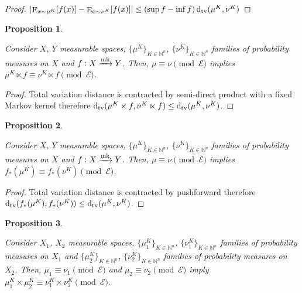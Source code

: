 \documentclass{article}
\numberwithin{equation}{section}
\theoremstyle{definition}
\theoremstyle{plain}
\newtheorem{proposition}{Proposition}[section]
\DeclareMathOperator{\E}{E}
\newcommand{\Dtv}{\operatorname{d}_{\textnormal{tv}}}
\newcommand{\Nats}{\mathbb{N}}
\newcommand{\Abs}[1]{\lvert #1 \rvert}
\newcommand{\Fall}{\mathcal{E}}
\newcommand{\Markov}{\xrightarrow{\textnormal{mk}}}
\begin{document}
\begin{proof}

$\Abs{\E_{x \sim \mu^K}[f(x)] - \E_{x \sim \nu^K}[f(x)]} \leq  (\sup f - \inf f)\Dtv(\mu^K, \nu^K)$
\end{proof}

\begin{samepage}
\begin{proposition}
\label{prp:prob_cong_semidir}

Consider $X$, $Y$ measurable spaces, $\{\mu^K\}_{K \in \Nats^n}$, $\{\nu^K\}_{K \in \Nats^n}$ families of probability measures on $X$ and $f: X \Markov Y$. Then, $\mu \equiv \nu \pmod \Fall$ implies $\mu^K \ltimes f \equiv \nu^K \ltimes f \pmod \Fall$.

\end{proposition}
\end{samepage}

\begin{proof}

Total variation distance is contracted by semi-direct product with a fixed Markov kernel therefore $\Dtv(\mu^K \ltimes f, \nu^K \ltimes f) \leq \Dtv(\mu^K, \nu^K)$.
\end{proof}

\begin{samepage}
\begin{proposition}
\label{prp:prob_cong_push}

Consider $X$, $Y$ measurable spaces, $\{\mu^K\}_{K \in \Nats^n}$, $\{\nu^K\}_{K \in \Nats^n}$ families of probability measures on $X$ and $f: X \Markov Y$. Then, $\mu \equiv \nu \pmod \Fall$ implies $f_*(\mu^K) \equiv f_*(\nu^K) \pmod \Fall$.

\end{proposition}
\end{samepage}

\begin{proof}

Total variation distance is contracted by pushforward therefore ${\Dtv(f_*(\mu^K), f_*(\nu^K)) \leq \Dtv(\mu^K, \nu^K)}$.
\end{proof}

\begin{samepage}
\begin{proposition}
\label{prp:prob_cong_dir}

Consider $X_1$, $X_2$ measurable spaces, $\{\mu_1^K\}_{K \in \Nats^n}$, $\{\nu_1^K\}_{K \in \Nats^n}$ families of probability measures on $X_1$ and $\{\mu_2^K\}_{K \in \Nats^n}$, $\{\nu_2^K\}_{K \in \Nats^n}$ families of probability measures on $X_2$. Then, $\mu_1 \equiv \nu_1 \pmod \Fall$ and $\mu_2 \equiv \nu_2 \pmod \Fall$ imply $\mu_1^K \times \mu_2^K \equiv \nu_1^K \times \nu_2^K \pmod \Fall$. 

\end{proposition}
\end{samepage}
\end{document}

